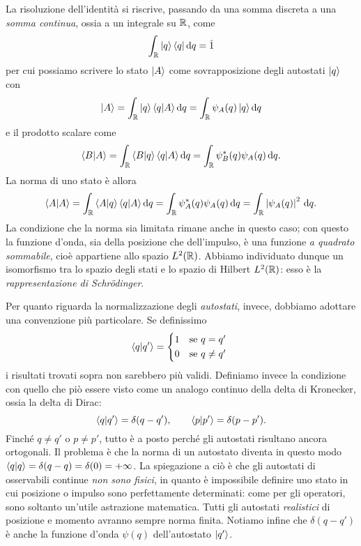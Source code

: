 La risoluzione dell'identità si riscrive, passando da una somma discreta a una \emph{somma continua}, ossia a un integrale su $\mathbb{R}$, come
\begin{equation}
	\int_{\mathbb{R}}\left|{q}\right\rangle\left\langle{q}\right|\textup{d} q=\hat{1}
	\label{eq:risoluzione-identita-continua}
\end{equation}
per cui possiamo scrivere lo stato $\left|{A}\right\rangle$ come sovrapposizione degli autostati $\left|{q}\right\rangle$ con
\begin{equation}
	\left|{A}\right\rangle=\int_{\mathbb{R}}\left|{q}\right\rangle\left\langle{q}\middle|{A}\right\rangle\textup{d} q=\int_{\mathbb{R}}\psi_A(q)\left|{q}\right\rangle\textup{d} q
	\label{eq:sovrapposizione-stati-continuo}
\end{equation}
e il prodotto scalare come
\begin{equation}
	\left\langle{B}\middle|{A}\right\rangle=\int_{\mathbb{R}}\left\langle{B}\middle|{q}\right\rangle\left\langle{q}\middle|{A}\right\rangle\textup{d} q=\int_{\mathbb{R}}\psi_B^*(q)\psi_A(q)\,\textup{d} q.
	\label{eq:prodotto-scalare-continuo}
\end{equation}
La norma di uno stato è allora
\begin{equation}
	\left\langle{A}\middle|{A}\right\rangle=\int_{\mathbb{R}}\left\langle{A}\middle|{q}\right\rangle\left\langle{q}\middle|{A}\right\rangle\textup{d} q=\int_{\mathbb{R}}\psi_A^*(q)\psi_A(q)\,\textup{d} q=\int_{\mathbb{R}}\left|{\psi_A(q)}\right|^2\,\textup{d} q.
	\label{eq:norma-stato-continuo}
\end{equation}
La condizione che la norma sia limitata rimane anche in questo caso; con questo la funzione d'onda, sia della posizione che dell'impulso, è una funzione \emph{a quadrato sommabile}, cioè appartiene allo spazio $L^2(\mathbb{R})$.
Abbiamo individuato dunque un isomorfismo tra lo spazio degli stati e lo spazio di Hilbert $L^2(\mathbb{R})$: esso è la \emph{rappresentazione di Schr\"odinger}.

Per quanto riguarda la normalizzazione degli \emph{autostati}, invece, dobbiamo adottare una convenzione più particolare.
Se definissimo
\begin{equation}
	\braket{q}{q'}=
	\begin{cases*}
		1& se $q=q'$\\ 0& se $q\ne q'$
	\end{cases*}
\end{equation}
i risultati trovati sopra non sarebbero più validi.
Definiamo invece la condizione con quello che piò essere visto come un analogo continuo della delta di Kronecker, ossia la delta di Dirac:
\begin{equation}
	\left\langle{q}\middle|{q'}\right\rangle=\delta(q-q'),\qquad\left\langle{p}\middle|{p'}\right\rangle=\delta(p-p').
	\label{eq:normalizzazione-autostati-continui}
\end{equation}
Finch\'e $q\ne q'$ o $p\ne p'$, tutto è a posto perch\'e gli autostati risultano ancora ortogonali.
Il problema è che la norma di un autostato diventa in questo modo $\left\langle{q}\middle|{q}\right\rangle=\delta(q-q)=\delta(0)=+\infty$.
La spiegazione a ciò è che gli autostati di osservabili continue \emph{non sono fisici}, in quanto è impossibile definire uno stato in cui posizione o impulso sono perfettamente determinati: come per gli operatori, sono soltanto un'utile astrazione matematica.
Tutti gli autostati \emph{realistici} di posizione e momento avranno sempre norma finita.
Notiamo infine che $\delta(q-q')$ è anche la funzione d'onda $\psi(q)$ dell'autostato $\left|{q'}\right\rangle$.

